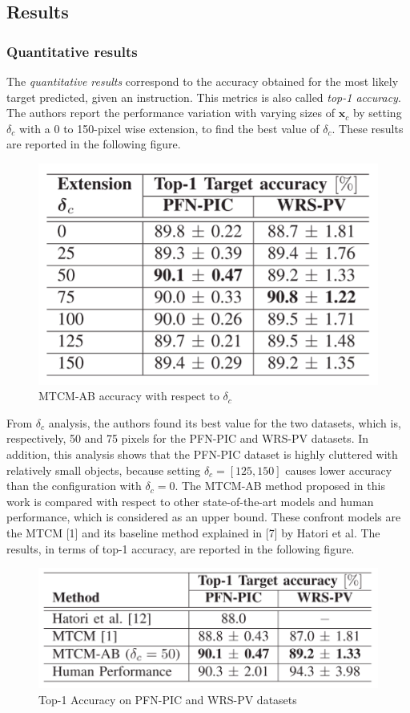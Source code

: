 \newpage
\subsection{Results}\label{header-n322}

\subsubsection{Quantitative results}\label{header-n323}

The \emph{quantitative results} correspond to the accuracy obtained for
the most likely target predicted, given an instruction. This metrics is
also called \emph{top-1 accuracy}. The authors report the performance
variation with varying sizes of ${\mathbf x}_c$ by setting $\delta_c$
with a 0 to 150-pixel wise extension, to find the best value of
$\delta_c$. These results are reported in the following figure.

\begin{figure}[h!]
\centering
\includegraphics[width=0.65\linewidth]{images/MTCMresultssize.png}
\caption{MTCM-AB accuracy with respect to $\delta_c$}
\end{figure}

From $\delta_c$ analysis, the authors found its best value for the two
datasets, which is, respectively, 50 and 75 pixels for the PFN-PIC and
WRS-PV datasets. In addition, this analysis shows that the PFN-PIC
dataset is highly cluttered with relatively small objects, because
setting $\delta_c = [125, 150]$ causes lower accuracy than the
configuration with $\delta_c = 0$. The MTCM-AB method proposed in this
work is compared with respect to other state-of-the-art models and human
performance, which is considered as an upper bound. These confront
models are the MTCM {[}1{]} and its baseline method explained in {[}7{]}
by Hatori et al. The results, in terms of top-1 accuracy, are reported
in the following figure.

\begin{figure}[h!]
\centering
\includegraphics[width=0.75\linewidth]{images/MTCMqualres.png}
\caption{Top-1 Accuracy on PFN-PIC and WRS-PV datasets}
\end{figure}

